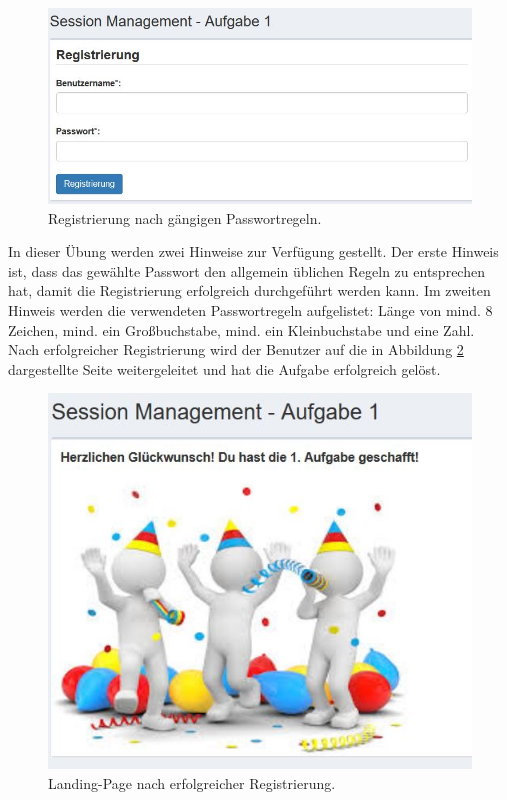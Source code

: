 \begin{figure}[]
	
	\centering
	
	\includegraphics[width=1.0\linewidth]{images/BrokenAuthenticationAndSessionManagement/Registrierung_Start}
	
	\caption[Aufgabe 1: Registrierung nach gängigen Passwortregeln.]{Registrierung nach gängigen Passwortregeln.}
	
	\label{fig:Aufgabe 1 Registrierung}
	
\end{figure}
\noindent In dieser Übung werden zwei Hinweise zur Verfügung gestellt. Der erste Hinweis ist, dass das gewählte Passwort den allgemein üblichen Regeln zu entsprechen hat, damit die Registrierung erfolgreich durchgeführt werden kann. Im zweiten Hinweis werden die verwendeten Passwortregeln aufgelistet: Länge von mind. 8 Zeichen, mind. ein Großbuchstabe, mind. ein Kleinbuchstabe und eine Zahl. \\
Nach erfolgreicher Registrierung wird der Benutzer auf die in Abbildung \ref{fig:Aufgabe 1 Abschluss} dargestellte Seite weitergeleitet und hat die Aufgabe erfolgreich gelöst.\\
\begin{figure}[H]
	\includegraphics[width=1.0\linewidth]{images/BrokenAuthenticationAndSessionManagement/Registrierung_Ende}
	\caption[Landing-Page nach erfolgreicher Registrierung.]{Landing-Page nach erfolgreicher Registrierung.}
	\label{fig:Aufgabe 1 Abschluss}
\end{figure}
